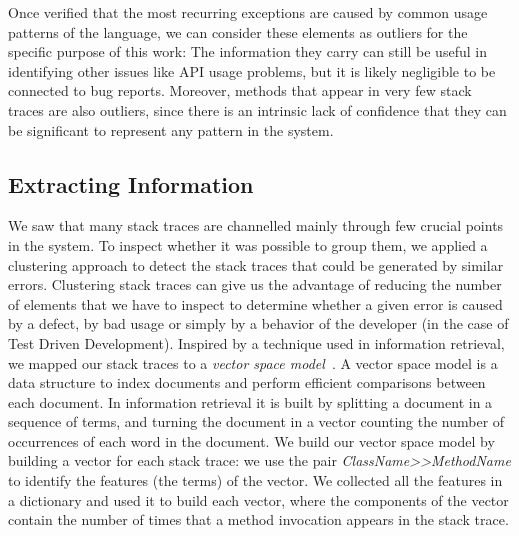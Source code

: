 Once verified that the most recurring exceptions are caused by common usage patterns of the language, we can consider these elements as outliers for the specific purpose of this work: The information they carry can still be useful in identifying other issues like API usage problems, but it is likely negligible to be connected to bug reports.
Moreover, methods that appear in very few stack traces are also outliers, since there is an intrinsic lack of confidence that they can be significant to represent any pattern in the system.

\subsection{Extracting Information}

We saw that many stack traces are channelled mainly through few crucial points in the system.
To inspect whether it was possible to group them, we applied a clustering approach to detect the stack traces that could be generated by similar errors.
Clustering stack traces can give us the advantage of reducing the number of elements that we have to inspect to determine whether a given error is caused by a defect, by bad usage or simply by a behavior of the developer (\eg in the case of Test Driven Development).
Inspired by a technique used in information retrieval, we mapped our stack traces to a \textit{vector space model}~\cite{salt1975}.
A vector space model is a data structure to index documents and perform efficient comparisons between each document.
In information retrieval it is built by splitting a document in a sequence of terms, and turning the document in a vector counting the number of occurrences of each word in the document.
We build our vector space model by building a vector for each stack trace: we use the pair \textit{ClassName{>}{>}MethodName} to identify the features (the terms) of the vector.
We collected all the features in a dictionary and used it to build each vector, where the components of the vector contain the number of times that a method invocation appears in the stack trace.



